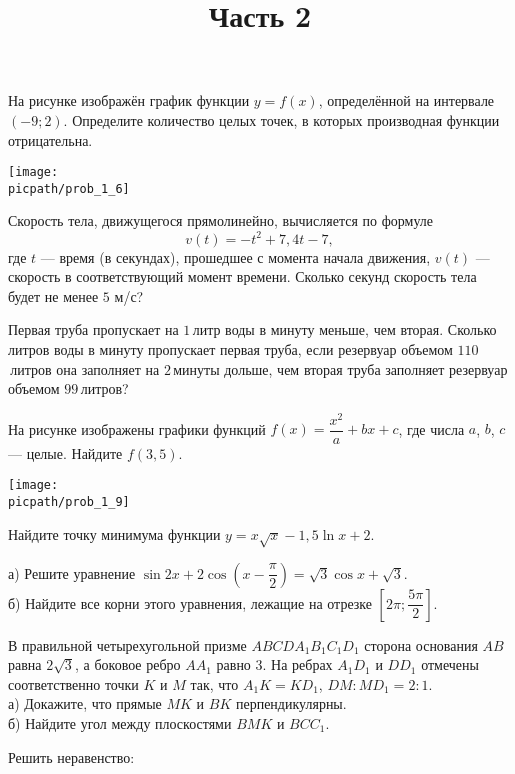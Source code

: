 \begin{training}[3]
\begin{listofex}
		На рисунке изображён график функции \( y = f(x) \), определённой на
		интервале \( (-9; 2) \). Определите количество целых точек, в которых производная функции отрицательна.
		\begin{center}
			\texttt{[image: \\picpath/prob\_1\_6]}
		\end{center}
		\foranswer
		\item Скорость тела, движущегося прямолинейно, вычисляется по формуле
		\[ v(t) = -t^2+7,4t-7, \]
		где \( t \) --- время (в секундах), прошедшее с момента начала движения,
		\( v(t) \) --- скорость в соответствующий момент времени.
		Сколько секунд скорость тела будет не менее \( 5 \) м/с?
		\foranswer
		\item Первая труба пропускает на \( 1 \) литр воды в минуту меньше, чем вторая.
		Сколько литров воды в минуту пропускает первая труба, если резервуар объемом \( 110 \) литров она заполняет на \( 2 \) минуты дольше,
		чем вторая труба заполняет резервуар объемом \( 99 \) литров?
		\foranswer
		\newpage
		\hphantom{Часть 1}
		\item 
		На рисунке изображены графики функций \( f(x) = \dfrac{x^2}{a}+bx+c \), где числа
		\( a \), \( b \), \( c \) --- целые. Найдите \( f(3,5) \).
		\begin{center}
			\texttt{[image: \\picpath/prob\_1\_9]}
		\end{center}
		\foranswer
		\item Найдите точку минимума функции \( y=x\sqrt{x}-1,5\ln x + 2 \).
		\foranswer
		\egepreambtwo
		\title{Часть 2}
		\egepreambthree
		\item
		а) Решите уравнение \( \sin2x + 2\cos \left( x - \dfrac{\pi}{2} \right) = \sqrt{3}\cos x + \sqrt{3} \).\\
		б) Найдите все корни этого уравнения, лежащие на отрезке \( \left[ 2\pi;\dfrac{5\pi}{2} \right] \).
		\item
		В правильной четырехугольной призме \( ABCDA_1B_1C_1D_1 \) сторона
		основания \( AB \) равна \( 2\sqrt{3} \), а боковое ребро \( AA_1 \) равно \( 3 \).
		На ребрах \( A_1D_1 \) и \( DD_1 \) отмечены соответственно точки \( K \) и \( M \) так,
		что \( A_1K = KD_1 \), \( DM : MD_1 = 2 : 1 \).\\
		а) Докажите, что прямые \( MK \) и \( BK \) перпендикулярны.\\
		б) Найдите угол между плоскостями \( BMK \) и \( BCC_1 \).
		\item Решить неравенство:

\end{listofex}
\end{training}
